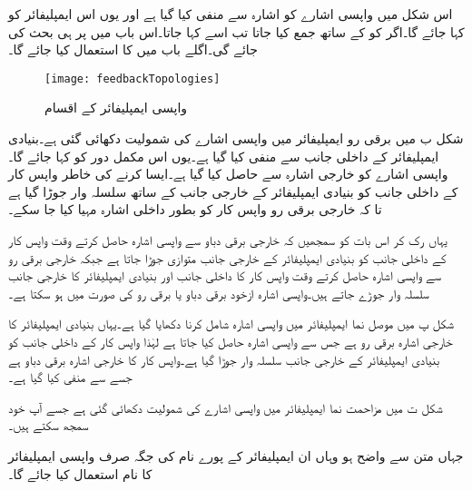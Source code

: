 اس شکل میں واپسی اشارے  کو اشارہ  سے منفی کیا گیا ہے اور یوں اس ایمپلیفائر کو  کہا جائے گا۔اگر   کو  کے ساتھ جمع کیا جاتا تب اسے   کہا جاتا۔اس باب میں  پر ہی بحث کی جائے گی۔اگلے باب میں  کا استعمال کیا جائے گا۔
\begin{figure}
\centering
\texttt{[image: feedbackTopologies]}
\caption{واپسی ایمپلیفائر کے اقسام}
\label{شکل_واپسی_ایمپلیفائر_کے_اقسام}
\end{figure}

شکل  ب میں برقی رو ایمپلیفائر میں واپسی اشارے کی شمولیت دکھائی گئی ہے۔بنیادی ایمپلیفائر کے داخلی جانب  سے  منفی کیا گیا ہے۔یوں اس مکمل دور کو  کہا جائے گا۔واپسی اشارے کو خارجی اشارہ  سے حاصل کیا گیا ہے۔ایسا کرنے کی خاطر واپس کار کے  داخلی جانب کو بنیادی ایمپلیفائر کے خارجی جانب کے ساتھ سلسلہ وار جوڑا گیا ہے تا کہ خارجی برقی رو  واپس کار کو بطور داخلی اشارہ مہیا کیا جا سکے۔

یہاں رک کر اس بات کو سمجھیں کہ خارجی برقی دباو  سے واپسی اشارہ حاصل کرتے وقت واپس کار کے داخلی جانب کو بنیادی ایمپلیفائر کے خارجی جانب  متوازی جوڑا جاتا ہے جبکہ خارجی برقی رو  سے واپسی اشارہ حاصل کرتے وقت واپس کار کا داخلی جانب اور بنیادی ایمپلیفائر کا خارجی جانب سلسلہ وار جوڑے جاتے ہیں۔واپسی اشارہ ازخود برقی دباو یا برقی رو کی صورت میں ہو سکتا ہے۔

شکل  پ میں  موصل نما ایمپلیفائر میں واپسی اشارہ شامل کرنا دکھایا گیا ہے۔یہاں بنیادی ایمپلیفائر کا خارجی اشارہ برقی رو  ہے جس سے واپسی اشارہ حاصل کیا جاتا ہے لہٰذا واپس کار کے داخلی جانب کو بنیادی ایمپلیفائر کے خارجی جانب  سلسلہ وار جوڑا گیا ہے۔واپس کار کا خارجی اشارہ برقی دباو  ہے جسے  سے منفی کیا گیا ہے۔

شکل  ت میں مزاحمت نما ایمپلیفائر میں واپسی اشارے کی شمولیت دکھائی گئی ہے جسے آپ خود سمجھ سکتے ہیں۔

جہاں متن سے واضح ہو وہاں ان ایمپلیفائر کے پورے نام کی جگہ صرف واپسی ایمپلیفائر کا نام استعمال کیا جائے گا۔



